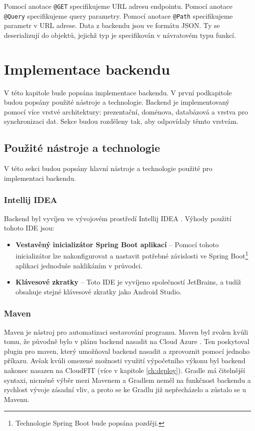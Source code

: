\noindent Pomocí anotace \lstinline|@GET| specifikujeme URL adresu endpointu. Pomocí anotace \lstinline|@Query| specifikujeme query parametry. Pomocí anotace \lstinline|@Path| specifikujeme parametr v URL adrese. Data z backendu jsou ve formátu JSON. Ty se deserializují do objektů, jejichž typ je specifikován v návratovém typu funkcí.

\chapter{Implementace backendu}
V této kapitole bude popsána implementace backendu. V první podkapitole budou popsány použité nástroje a technologie. Backend je implementovaný pomocí více vrstvé \linebreak architektury: prezentační, doménova, databázová a vrstva pro synchronizaci dat. Sekce budou rozděleny tak, aby odpovídaly těmto vrstvám.

\section {Použité nástroje a technologie}
V této sekci budou popsány hlavní nástroje a technologie použité pro implementaci backendu.

\subsection*{Intellij IDEA}
Backend byl vyvíjen ve vývojovém prostředí Intellij IDEA \cite{idea}. Výhody použití tohoto IDE jsou:
	
\begin{itemize}
	\item \textbf{Vestavěný inicializátor Spring Boot aplikací} -- Pomocí tohoto inicializátor lze nakonfigurovat a nastavit potřebné závislosti ve Spring Boot\footnote{Technologie Spring Boot bude popsána později.} aplikaci jednoduše naklikáním \linebreak v průvodci.
	
	\item \textbf{Klávesové zkratky} -- Toto IDE je vyvíjeno společností JetBrains, a tudíž obsahuje stejné klávesové zkratky jako Android Studio.
\end{itemize}

\subsection*{Maven}
Maven je nástroj pro automatizaci sestavování programu. Maven byl zvolen kvůli tomu, že původně bylo v plánu backend nasadit na Cloud Azure \cite{azure}. Ten poskytoval plugin pro maven, který umožňoval backend nasadit a zprovoznit pomocí jednoho příkazu. Avšak kvůli omezené možnosti využití výpočetního výkonu byl backend nakonec nasazen na CloudFIT (více v kapitole \ref{ch:deploy}). Gradle má čitelnější syntaxi, nicméně výběr mezi Mavenem a Gradlem neměl na funkčnost backendu \linebreak a rychlost vývoje zásadní vliv, a proto se ke Gradlu již nepřecházelo a zůstalo se u Mavenu.

